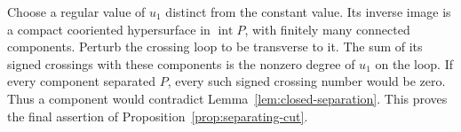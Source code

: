 Choose a regular value of $u_1$ distinct from the constant value.
Its inverse image is a compact cooriented hypersurface in
$\operatorname{int}P$, with finitely many connected components.
Perturb the crossing loop to be transverse to it. The sum of its signed
crossings with these components is the nonzero degree of $u_1$ on the
loop. If every component separated $P$, every such signed crossing
number would be zero. Thus a component would contradict
Lemma~\ref{lem:closed-separation}. This proves the final assertion of
Proposition~\ref{prop:separating-cut}.
